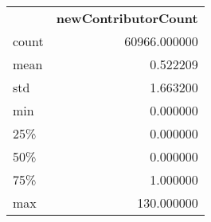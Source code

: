 \begin{tabular}{lr}
 & \textbf{newContributorCount} \\
count & 60966.000000 \\
mean & 0.522209 \\
std & 1.663200 \\
min & 0.000000 \\
25\% & 0.000000 \\
50\% & 0.000000 \\
75\% & 1.000000 \\
max & 130.000000 \\
\end{tabular}
